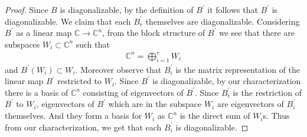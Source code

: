 \documentclass[12pt]{article}
\theoremstyle{definition}
\theoremstyle{remark}
\begin{document}
\begin{proof}
  Since $B$ is diagonalizable, by the definition of $B^\prime$ it
  follows that $B^\prime$ is diagonalizable. We claim that each
  $B_r^\prime$ themselves are diagonalizable. Considering $B^\prime$
  as a linear map $\mathbb{C} \to \mathbb{C}^n$, from the block
  structure of $B^\prime$ we see that there are subspaces $W_i
  \subset \mathbb{C}^n$ such that
  \begin{align*}
    \mathbb{C}^n = \bigoplus_{i = 1}^r W_i
  \end{align*}
  and $B^\prime(W_i) \subset W_i$. Moreover observe that $B_i^\prime$
  is the matrix representation of the linear map $B^\prime$
  restricted to $W_i$. Since $B^\prime$ is diagonalizable, by our
  characterization there is a basis of $\mathbb{C}^n$ consisting of
  eigenvectors of $B^\prime$. Since $B_i^\prime$ is the restriction
  of $B^\prime$ to $W_i$, eigenvectors of $B^\prime$ which are in the
  subspace $W_i$ are eigenvectors of $B_i^\prime$ themselves. And
  they form a basis for $W_i$ as $\mathbb{C}^n$ is the direct
  sum of $W_i$s. Thus from our characterization, we get that each
  $B_i^\prime$ is diagonalizable.


\end{proof}
\end{document}
